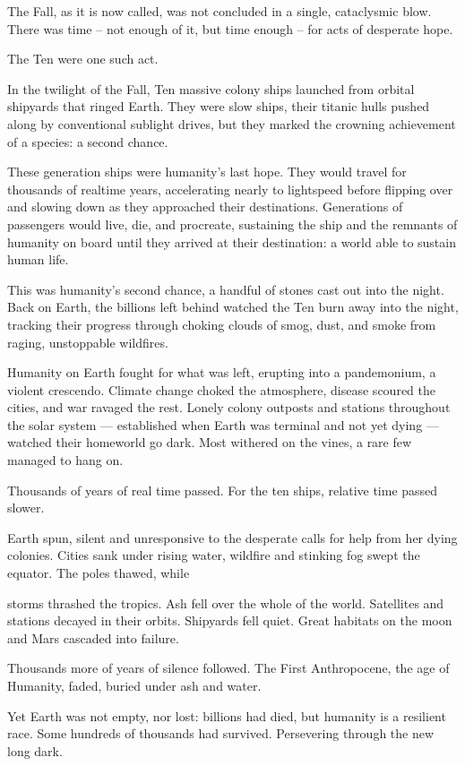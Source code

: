 The Fall, as it is now called, was not concluded in a single, cataclysmic blow. There was time --
not enough of it, but time enough -- for acts of desperate hope.

The Ten were one such act.

In the twilight of the Fall, Ten massive colony ships launched from orbital shipyards that ringed
Earth. They were slow ships, their titanic hulls pushed along by conventional sublight drives, but
they marked the crowning achievement of a species: a second chance.

These generation ships were humanity’s last hope. They would travel for thousands of realtime
years, accelerating nearly to lightspeed before flipping over and slowing down as they
approached their destinations. Generations of passengers would live, die, and procreate,
sustaining the ship and the remnants of humanity on board until they arrived at their destination:
a world able to sustain human life.

This was humanity’s second chance, a handful of stones cast out into the night. Back on Earth,
the billions left behind watched the Ten burn away into the night, tracking their progress through
choking clouds of smog, dust, and smoke from raging, unstoppable wildfires.

Humanity on Earth fought for what was left, erupting into a pandemonium, a violent crescendo.
Climate change choked the atmosphere, disease scoured the cities, and war ravaged the rest.
Lonely colony outposts and stations throughout the solar system — established when Earth was
terminal and not yet dying — watched their homeworld go dark. Most withered on the vines, a
rare few managed to hang on.

Thousands of years of real time passed. For the ten ships, relative time passed slower.

Earth spun, silent and unresponsive to the desperate calls for help from her dying colonies. Cities
sank under rising water, wildfire and stinking fog swept the equator. The poles thawed, while

storms thrashed the tropics. Ash fell over the whole of the world. Satellites and stations decayed
in their orbits. Shipyards fell quiet. Great habitats on the moon and Mars cascaded into failure.

Thousands more of years of silence followed. The First Anthropocene, the age of Humanity,
faded, buried under ash and water.

Yet Earth was not empty, nor lost: billions had died, but humanity is a resilient race. Some
hundreds of thousands had survived. Persevering through the new long dark.

